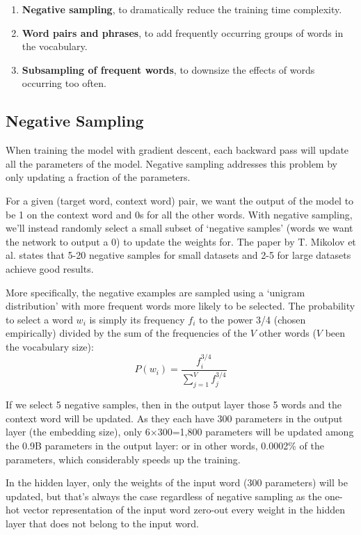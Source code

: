 \begin{enumerate}
    \item \textbf{Negative sampling}, to dramatically reduce the training time complexity.
    \item \textbf{Word pairs and phrases}, to add frequently occurring groups of words in the vocabulary.
    \item \textbf{Subsampling of frequent words}, to downsize the effects of words occurring too often.
\end{enumerate}

\subsection{Negative Sampling}
When training the model with gradient descent, each backward pass will update all the parameters of the model. Negative sampling addresses this problem by only updating a fraction of the parameters.

For a given (target word, context word) pair, we want the output of the model to be 1 on the context word and 0s for all the other words. With negative sampling, we'll instead randomly select a small subset of `negative samples' (words we want the network to output a 0) to update the weights for. The paper by T. Mikolov et al. \cite{word2vec2} states that 5-20 negative samples for small datasets and 2-5 for large datasets achieve good results.

More specifically, the negative examples are sampled using a `unigram distribution' with more frequent words more likely to be selected. The probability to select a word $w_i$ is simply its frequency $f_i$ to the power 3/4 (chosen empirically) divided by the sum of the frequencies of the $V$ other words ($V$ been the vocabulary size):
\begin{equation}
    P(w_i) = \frac{f_i^{3/4}}{\sum_{j=1}^V f_j^{3/4}}
\end{equation}

If we select 5 negative samples, then in the output layer those 5 words and the context word will be updated. As they each have 300 parameters in the output layer (the embedding size), only 6$\times$300=1,800 parameters will be updated among the 0.9B parameters in the output layer: or in other words, 0.0002\% of the parameters, which considerably speeds up the training.

In the hidden layer, only the weights of the input word (300 parameters) will be updated, but that's always the case regardless of negative sampling as the one-hot vector representation of the input word zero-out every weight in the hidden layer that does not belong to the input word.

